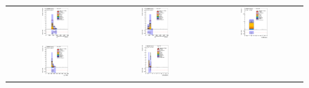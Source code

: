 \clearpage
\begin{figure}[htbp]
\begin{center}
\begin{tabular}{ccc}
%
\includegraphics[width=0.30\textwidth]{appendices/figures/sdrs/JetPtB1_ELEMUONCR7_1W_NOMINAL.eps}  &
\includegraphics[width=0.30\textwidth]{appendices/figures/sdrs/JetPtB2_ELEMUONCR7_1W_NOMINAL.eps} &
\includegraphics[width=0.30\textwidth]{appendices/figures/sdrs/nWhad_ELEMUONCR7_1W_NOMINAL_logscale.eps} \\
\includegraphics[width=0.30\textwidth]{appendices/figures/sdrs/VLQAna_WbX_W1Pt_ELEMUONCR7_1W_NOMINAL.eps} &
\includegraphics[width=0.30\textwidth]{appendices/figures/sdrs/VLQAna_WbX_DRLepMet_ELEMUONCR7_1W_NOMINAL.eps} &

\end{tabular}
\end{center}
\end{figure}
